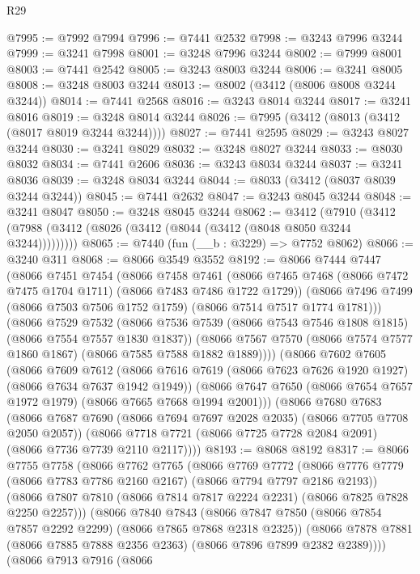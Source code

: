 \begin{lexlean}{R29}
\begin{coremodule}
@7995 := @7992 @7994
@7996 := @7441 @2532
@7998 := @3243 @7996 @3244
@7999 := @3241 @7998
@8001 := @3248 @7996 @3244
@8002 := @7999 @8001
@8003 := @7441 @2542
@8005 := @3243 @8003 @3244
@8006 := @3241 @8005
@8008 := @3248 @8003 @3244
@8013 := @8002 (@3412 (@8006 @8008 @3244 @3244))
@8014 := @7441 @2568
@8016 := @3243 @8014 @3244
@8017 := @3241 @8016
@8019 := @3248 @8014 @3244
@8026 := @7995 (@3412 (@8013 (@3412 (@8017 @8019 @3244 @3244))))
@8027 := @7441 @2595
@8029 := @3243 @8027 @3244
@8030 := @3241 @8029
@8032 := @3248 @8027 @3244
@8033 := @8030 @8032
@8034 := @7441 @2606
@8036 := @3243 @8034 @3244
@8037 := @3241 @8036
@8039 := @3248 @8034 @3244
@8044 := @8033 (@3412 (@8037 @8039 @3244 @3244))
@8045 := @7441 @2632
@8047 := @3243 @8045 @3244
@8048 := @3241 @8047
@8050 := @3248 @8045 @3244
@8062 := @3412
    (@7910 (@3412 (@7988 (@3412 (@8026 (@3412 (@8044 (@3412 (@8048 @8050 @3244 @3244)))))))))
@8065 := @7440 (fun (__b : @3229) => @7752 @8062)
@8066 := @3240 @311
@8068 := @8066 @3549 @3552
@8192 := @8066
    @7444
    @7447
    (@8066
      @7451
      @7454
      (@8066
        @7458
        @7461
        (@8066 @7465 @7468 (@8066 @7472 @7475 @1704 @1711) (@8066 @7483 @7486 @1722 @1729))
        (@8066 @7496 @7499 (@8066 @7503 @7506 @1752 @1759) (@8066 @7514 @7517 @1774 @1781)))
      (@8066
        @7529
        @7532
        (@8066 @7536 @7539 (@8066 @7543 @7546 @1808 @1815) (@8066 @7554 @7557 @1830 @1837))
        (@8066 @7567 @7570 (@8066 @7574 @7577 @1860 @1867) (@8066 @7585 @7588 @1882 @1889))))
    (@8066
      @7602
      @7605
      (@8066
        @7609
        @7612
        (@8066 @7616 @7619 (@8066 @7623 @7626 @1920 @1927) (@8066 @7634 @7637 @1942 @1949))
        (@8066 @7647 @7650 (@8066 @7654 @7657 @1972 @1979) (@8066 @7665 @7668 @1994 @2001)))
      (@8066
        @7680
        @7683
        (@8066 @7687 @7690 (@8066 @7694 @7697 @2028 @2035) (@8066 @7705 @7708 @2050 @2057))
        (@8066 @7718 @7721 (@8066 @7725 @7728 @2084 @2091) (@8066 @7736 @7739 @2110 @2117))))
@8193 := @8068 @8192
@8317 := @8066
    @7755
    @7758
    (@8066
      @7762
      @7765
      (@8066
        @7769
        @7772
        (@8066 @7776 @7779 (@8066 @7783 @7786 @2160 @2167) (@8066 @7794 @7797 @2186 @2193))
        (@8066 @7807 @7810 (@8066 @7814 @7817 @2224 @2231) (@8066 @7825 @7828 @2250 @2257)))
      (@8066
        @7840
        @7843
        (@8066 @7847 @7850 (@8066 @7854 @7857 @2292 @2299) (@8066 @7865 @7868 @2318 @2325))
        (@8066 @7878 @7881 (@8066 @7885 @7888 @2356 @2363) (@8066 @7896 @7899 @2382 @2389))))
    (@8066
      @7913
      @7916
      (@8066

\end{coremodule}
\end{lexlean}
